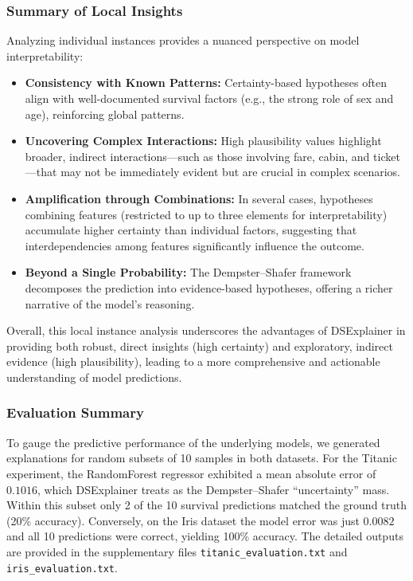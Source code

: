 \documentclass[acmlarge]{acmart}
\begin{document}
\subsubsection{Summary of Local Insights}

Analyzing individual instances provides a nuanced perspective on model interpretability:
\begin{itemize}
    \item \textbf{Consistency with Known Patterns:} Certainty-based hypotheses often align with well-documented survival factors (e.g., the strong role of sex and age), reinforcing global patterns.
    \item \textbf{Uncovering Complex Interactions:} High plausibility values highlight broader, indirect interactions—such as those involving fare, cabin, and ticket—that may not be immediately evident but are crucial in complex scenarios.
    \item \textbf{Amplification through Combinations:} In several cases, hypotheses combining features (restricted to up to three elements for interpretability) accumulate higher certainty than individual factors, suggesting that interdependencies among features significantly influence the outcome.
    \item \textbf{Beyond a Single Probability:} The Dempster–Shafer framework decomposes the prediction into evidence-based hypotheses, offering a richer narrative of the model’s reasoning.
\end{itemize}

Overall, this local instance analysis underscores the advantages of DSExplainer in providing both robust, direct insights (high certainty) and exploratory, indirect evidence (high plausibility), leading to a more comprehensive and actionable understanding of model predictions.
\subsubsection{Evaluation Summary}

To gauge the predictive performance of the underlying models, we generated explanations for random subsets of 10 samples in both datasets. For the Titanic experiment, the RandomForest regressor exhibited a mean absolute error of $0.1016$, which DSExplainer treats as the Dempster--Shafer ``uncertainty'' mass. Within this subset only 2 of the 10 survival predictions matched the ground truth (20\% accuracy). Conversely, on the Iris dataset the model error was just $0.0082$ and all 10 predictions were correct, yielding 100\% accuracy. The detailed outputs are provided in the supplementary files \texttt{titanic\_evaluation.txt} and \texttt{iris\_evaluation.txt}.
\end{document}
